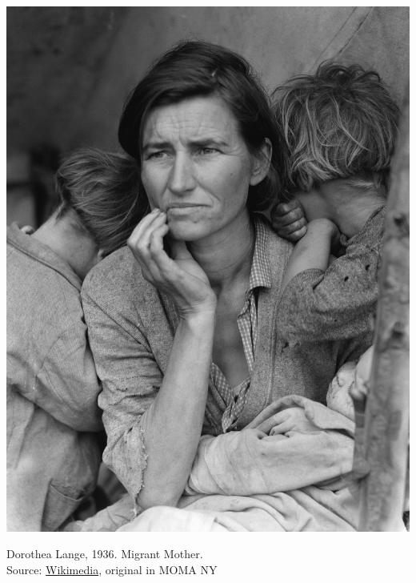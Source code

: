 \documentclass{beamer}
\begin{document}
\begin{frame}
\includegraphics[height = .85\textheight]{figures/Lange-MigrantMother}\\
\begin{footnotesize}
Dorothea Lange, 1936. Migrant Mother.\\
Source: \href{https://en.wikipedia.org/wiki/Migrant_Mother}{Wikimedia}, original in MOMA NY
\end{footnotesize}
\end{frame}
\end{document}
